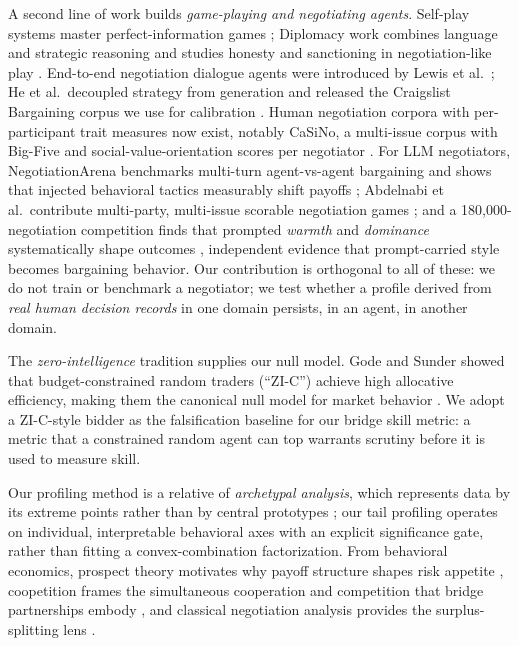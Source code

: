 \documentclass[runningheads]{llncs}
\begin{document}
A second line of work builds \emph{game-playing and negotiating
agents}. Self-play systems master
perfect-information games \cite{silver2018general}; Diplomacy work
combines language and strategic reasoning and studies honesty and
sanctioning in negotiation-like play
\cite{kramar2022negotiation,bakhtin2022cicero}. End-to-end negotiation
dialogue agents were introduced by Lewis et al.\
\cite{lewis2017deal}; He et al.\ decoupled strategy from generation and
released the Craigslist Bargaining corpus we use for calibration
\cite{he2018decoupling}. Human negotiation corpora with per-participant
trait measures now exist, notably CaSiNo, a multi-issue corpus with
Big-Five and social-value-orientation scores per negotiator
\cite{chawla2021casino}. For LLM negotiators, NegotiationArena
benchmarks multi-turn agent-vs-agent bargaining and shows that injected
behavioral tactics measurably shift payoffs
\cite{bianchi2024negotiationarena}; Abdelnabi et al.\ contribute
multi-party, multi-issue scorable negotiation games
\cite{abdelnabi2024cooperation}; and a 180{,}000-negotiation
competition finds that prompted \emph{warmth} and \emph{dominance}
systematically shape outcomes \cite{vaccaro2026advancing}, independent evidence that prompt-carried style becomes bargaining
behavior. Our contribution is orthogonal to all of these: we do not
train or benchmark a negotiator; we test whether a profile derived from
\emph{real human decision records} in one domain persists, in an
agent, in another domain.

The \emph{zero-intelligence} tradition supplies our null model. Gode
and Sunder showed that budget-constrained random traders (``ZI-C'')
achieve high allocative efficiency, making them the canonical null
model for market behavior \cite{gode1993zi}. We adopt a ZI-C-style
bidder as the falsification baseline for our bridge skill metric: a
metric that a constrained random agent can top warrants scrutiny before
it is used to measure skill.

Our profiling method is a relative of \emph{archetypal analysis}, which
represents data by its extreme points rather than by central prototypes
\cite{cutler1994archetypal}; our tail profiling operates on individual,
interpretable behavioral axes with an explicit significance gate,
rather than fitting a convex-combination factorization. From
behavioral economics, prospect theory motivates why payoff structure
shapes risk appetite \cite{kahneman1979prospect}, coopetition frames
the simultaneous cooperation and competition that bridge partnerships
embody \cite{brandenburger1996coopetition}, and classical negotiation
analysis provides the surplus-splitting lens
\cite{raiffa1982art,nash1950bargaining}.
\end{document}
